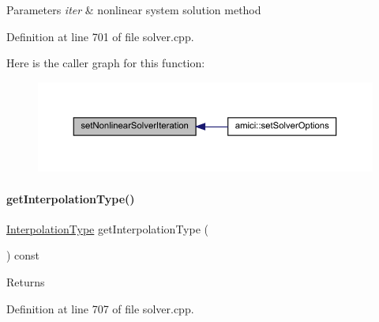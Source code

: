 \begin{DoxyParams}{Parameters}
{\em iter} & nonlinear system solution method \\
\hline
\end{DoxyParams}


Definition at line 701 of file solver.\+cpp.

Here is the caller graph for this function\+:
\nopagebreak
\begin{figure}[H]
\begin{center}
\leavevmode
\includegraphics[width=350pt]{classamici_1_1_solver_a1dc7983f545ee95f7e6fb38cfb0b3286_icgraph}
\end{center}
\end{figure}
\mbox{\label{classamici_1_1_solver_a69568ccb5de1bcdd4344e105ddb12324}} 
\paragraph{\texorpdfstring{get\+Interpolation\+Type()}{getInterpolationType()}}
{\footnotesize\ttfamily \mbox{\hyperlink{namespaceamici_a8472f01c511d77bbfb981a46618ea1ea}{Interpolation\+Type}} get\+Interpolation\+Type (\begin{DoxyParamCaption}{ }\end{DoxyParamCaption}) const}

\begin{DoxyReturn}{Returns}

\end{DoxyReturn}


Definition at line 707 of file solver.\+cpp.

\mbox{\label{classamici_1_1_solver_a9d9a0a5f8cdfdb993960706c646e240f}} 
